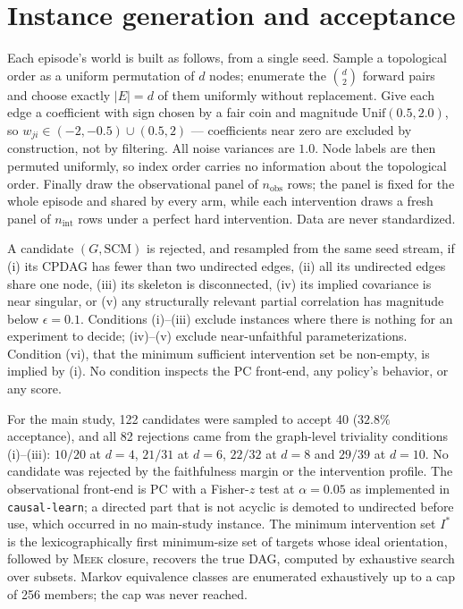 \documentclass{article}
\newcommand{\meek}{\textsc{Meek}}
\begin{document}
\section{Instance generation and acceptance}
\label{app:instances}

Each episode's world is built as follows, from a single seed. Sample a topological order as a
uniform permutation of $d$ nodes; enumerate the $\binom{d}{2}$ forward pairs and choose
exactly $|E|=d$ of them uniformly without replacement. Give each edge a coefficient with sign
chosen by a fair coin and magnitude $\mathrm{Unif}(0.5, 2.0)$, so $w_{ji} \in (-2,-0.5) \cup
(0.5, 2)$ --- coefficients near zero are excluded by construction, not by filtering. All
noise variances are $1.0$. Node labels are then permuted uniformly, so index order carries no
information about the topological order. Finally draw the observational panel of
$n_{\mathrm{obs}}$ rows; the panel is fixed for the whole episode and shared by every arm,
while each intervention draws a fresh panel of $n_{\mathrm{int}}$ rows under a perfect hard
intervention. Data are never standardized.

A candidate $(G, \mathrm{SCM})$ is rejected, and resampled from the same seed stream, if
(i) its CPDAG has fewer than two undirected edges, (ii) all its undirected edges share one
node, (iii) its skeleton is disconnected, (iv) its implied covariance is near singular, or
(v) any structurally relevant partial correlation has magnitude below $\epsilon = 0.1$.
Conditions (i)--(iii) exclude instances where there is nothing for an experiment to decide;
(iv)--(v) exclude near-unfaithful parameterizations. Condition (vi), that the minimum
sufficient intervention set be non-empty, is implied by (i). No condition inspects the PC
front-end, any policy's behavior, or any score.

For the main study, 122 candidates were sampled to accept 40 ($32.8\%$ acceptance), and all
82 rejections came from the graph-level triviality conditions (i)--(iii): $10/20$ at $d=4$,
$21/31$ at $d=6$, $22/32$ at $d=8$ and $29/39$ at $d=10$. No candidate was rejected by the
faithfulness margin or the intervention profile. The observational front-end is PC with a
Fisher-$z$ test at $\alpha=0.05$ as implemented in \texttt{causal-learn}; a directed part
that is not acyclic is demoted to undirected before use, which occurred in no main-study
instance. The minimum intervention set $I^*$ is the lexicographically first minimum-size set
of targets whose ideal orientation, followed by \meek{} closure, recovers the true DAG,
computed by exhaustive search over subsets. Markov equivalence classes are enumerated
exhaustively up to a cap of 256 members; the cap was never reached.
\end{document}
